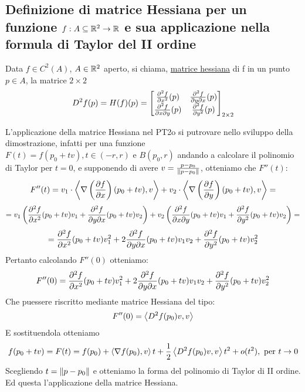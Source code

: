 \subsection{ Definizione di matrice Hessiana per un funzione $f: A \subseteq \mathbb{R}^2 \to \mathbb{R}$
e sua applicazione nella formula di Taylor del II ordine}
\begin{definition}
  Data $f \in C^2(A)$, $A \in \mathbb{R}^2$ aperto, si chiama, \underline{matrice hessiana}
  di f in un punto $p\in A$, la matrice $2\times 2$
  $$D^2f(p) = H(f)(p) = \begin{bmatrix}
    \frac{\partial^2 f}{\partial x^2}(p) & \frac{\partial^2 f}{\partial y \partial x}(p) \\
    \frac{\partial^2 f}{\partial x \partial y}(p) & \frac{\partial^2 f}{\partial y^2}(p) \\
  \end{bmatrix}_{2\times 2}$$
\end{definition}
\hfill \break
L'applicazione della matrice Hessiana nel PT2o si pu\aco trovare nello 
sviluppo della dimostrazione, infatti per una funzione
$F(t) = f(p_0+tv), t \in (-r,r) \text{ e } B(p_0,r)$ andando a calcolare il polinomio di Taylor 
per $t = 0$, e supponendo di avere $v = \frac{p-p_0}{\left\lVert p-p_0\right\rVert}$,
otteniamo che $F''(t)$:
$$F''(t) = v_1 \cdot \left\langle \nabla \left(\frac{\partial f}{\partial x}\right)(p_0+tv), v \right\rangle + 
            v_2 \cdot \left\langle \nabla \left(\frac{\partial f}{\partial y}\right)(p_0+tv), v \right\rangle = $$
$$= v_1 \left(\frac{\partial^2 f}{\partial x^2}(p_0+tv)v_1 + \frac{\partial^2 f}{\partial y \partial x}(p_0+tv)v_2\right) + 
    v_2 \left( \frac{\partial^2 f}{\partial x \partial y}(p_0+tv)v_1 + \frac{\partial^2 f}{\partial y^2}(p_0+tv)v_2\right) = $$
$$ = \frac{\partial^2 f}{\partial x^2}(p_0+tv)v_1^2 + 2 \frac{\partial^2 f}{\partial y \partial x}(p_0+tv)v_1 v_2 + 
      \frac{\partial^2 f}{\partial y^2}(p_0 + tv)v_2^2$$
Pertanto calcolando $F''(0)$ otteniamo:
$$F''(0) = \frac{\partial^2 f}{\partial x^2}(p_0+tv)v_1^2 + 2 \frac{\partial^2 f}{\partial y \partial x}(p_0+tv)v_1 v_2 + 
  \frac{\partial^2 f}{\partial y^2}(p_0 + tv)v_2^2$$
Che pu\aco essere riscritto mediante matrice Hessiana del tipo:
$$F''(0) = \left\langle D^2f(p_0)v,v \right\rangle$$
E sostituendola otteniamo
$$f(p_0+tv) = F(t) = f(p_0) + \left\langle \nabla f(p_0), v \right\rangle t + \frac{1}{2} \left\langle D^2 f(p_0)v, v \right\rangle t^2 + o(t^2) , \text{ per } t \to 0$$
Scegliendo $t = \left\lVert p-p_0\right\rVert$ e otteniamo la forma del polinomio di Taylor di II ordine. 
Ed \ace questa l'applicazione della matrice Hessiana.